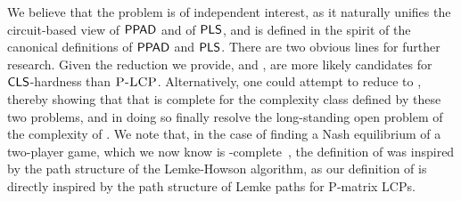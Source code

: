 We believe that the \EOPL problem is of independent interest, as it naturally
unifies the circuit-based view of $\mathsf{PPAD}$ and of $\mathsf{PLS}$, and is defined
in the spirit of the canonical definitions of $\mathsf{PPAD}$ and $\mathsf{PLS}$.  There
are two obvious lines for further research.  Given the reduction we provide,
\EOPL and \EOML, are more likely candidates for $\mathsf{CLS}$-hardness than $\textsc{P-LCP}$. 
Alternatively, one could attempt to reduce \EOPL to \PLCP, thereby showing that
that \PLCP is complete for the complexity class defined by these two problems,
and in doing so finally resolve the long-standing open problem of the complexity
of \PLCP.
We note that, in the case of finding a Nash equilibrium of a two-player game,
which we now know is
\PPAD-complete~\cite{chen2009settling,daskalakis2009complexity}, the definition
of \PPAD was inspired by the path structure of the Lemke-Howson algorithm, as
our definition of \EOPL is directly inspired by the path structure of Lemke
paths for P-matrix LCPs.







